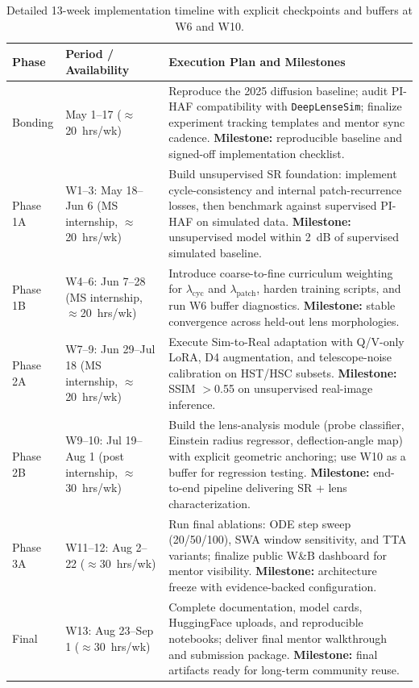 \documentclass[11pt,a4paper]{article}
\begin{document}
\begin{table}[H]
\centering
\caption{Detailed 13-week implementation timeline with explicit checkpoints and buffers at W6 and W10.}
\small
\begin{tabularx}{\linewidth}{C{1.4cm} L{3.9cm} Y}
\toprule
\textbf{Phase} & \textbf{Period / Availability} & \textbf{Execution Plan and Milestones} \\
\midrule
{}
Bonding & May 1--17 ($\approx$20~hrs/wk) & Reproduce the 2025 diffusion baseline; audit PI-HAF compatibility with \texttt{DeepLenseSim}; finalize experiment tracking templates and mentor sync cadence. \textbf{Milestone:} reproducible baseline and signed-off implementation checklist. \\
\midrule
{}
Phase 1A & W1--3: May 18--Jun 6 (MS internship, $\approx$20~hrs/wk) & Build unsupervised SR foundation: implement cycle-consistency and internal patch-recurrence losses, then benchmark against supervised PI-HAF on simulated data. \textbf{Milestone:} unsupervised model within 2~dB of supervised simulated baseline. \\
\midrule
{}
Phase 1B & W4--6: Jun 7--28 (MS internship, $\approx$20~hrs/wk) & Introduce coarse-to-fine curriculum weighting for $\lambda_{\text{cyc}}$ and $\lambda_{\text{patch}}$, harden training scripts, and run W6 buffer diagnostics. \textbf{Milestone:} stable convergence across held-out lens morphologies. \\
\midrule
{}
Phase 2A & W7--9: Jun 29--Jul 18 (MS internship, $\approx$20~hrs/wk) & Execute Sim-to-Real adaptation with Q/V-only LoRA, D4 augmentation, and telescope-noise calibration on HST/HSC subsets. \textbf{Milestone:} SSIM $>$0.55 on unsupervised real-image inference. \\
\midrule
{}
Phase 2B & W9--10: Jul 19--Aug 1 (post internship, $\approx$30~hrs/wk) & Build the lens-analysis module (probe classifier, Einstein radius regressor, deflection-angle map) with explicit geometric anchoring; use W10 as a buffer for regression testing. \textbf{Milestone:} end-to-end pipeline delivering SR + lens characterization. \\
\midrule
{}
Phase 3A & W11--12: Aug 2--22 ($\approx$30~hrs/wk) & Run final ablations: ODE step sweep (20/50/100), SWA window sensitivity, and TTA variants; finalize public W\&B dashboard for mentor visibility. \textbf{Milestone:} architecture freeze with evidence-backed configuration. \\
\midrule
{}
Final & W13: Aug 23--Sep 1 ($\approx$30~hrs/wk) & Complete documentation, model cards, HuggingFace uploads, and reproducible notebooks; deliver final mentor walkthrough and submission package. \textbf{Milestone:} final artifacts ready for long-term community reuse. \\
\bottomrule
\end{tabularx}
\normalsize
\end{table}
\end{document}
